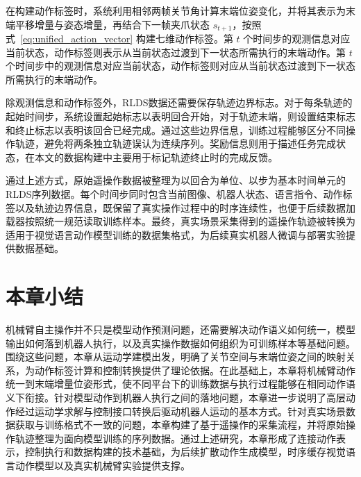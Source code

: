 在构建动作标签时，系统利用相邻两帧关节角计算末端位姿变化，并将其表示为末端平移增量与姿态增量，再结合下一帧夹爪状态 $s_{t+1}$，按照式~\ref{eq:unified_action_vector} 构建七维动作标签。第 $t$ 个时间步的观测信息对应当前状态，动作标签则表示从当前状态过渡到下一状态所需执行的末端动作。第 $t$ 个时间步中的观测信息对应当前状态，动作标签则对应从当前状态过渡到下一状态所需执行的末端动作。

除观测信息和动作标签外，RLDS数据还需要保存轨迹边界标志。对于每条轨迹的起始时间步，系统设置起始标志以表明回合开始，对于轨迹末端，则设置结束标志和终止标志以表明该回合已经完成。通过这些边界信息，训练过程能够区分不同操作轨迹，避免将两条独立轨迹误认为连续序列。奖励信息则用于描述任务完成状态，在本文的数据构建中主要用于标记轨迹终止时的完成反馈。

通过上述方式，原始遥操作数据被整理为以回合为单位、以步为基本时间单元的RLDS序列数据。每个时间步同时包含当前图像、机器人状态、语言指令、动作标签以及轨迹边界信息，既保留了真实操作过程中的时序连续性，也便于后续数据加载器按照统一规范读取训练样本。最终，真实场景采集得到的遥操作轨迹被转换为适用于视觉语言动作模型训练的数据集格式，为后续真实机器人微调与部署实验提供数据基础。

\section{本章小结}

机械臂自主操作并不只是模型动作预测问题，还需要解决动作语义如何统一，模型输出如何落到机器人执行，以及真实操作数据如何组织为可训练样本等基础问题。围绕这些问题，本章从运动学建模出发，明确了关节空间与末端位姿之间的映射关系，为动作标签计算和控制转换提供了理论依据。在此基础上，本章将机械臂动作统一到末端增量位姿形式，使不同平台下的训练数据与执行过程能够在相同动作语义下衔接。针对模型动作到机器人执行之间的落地问题，本章进一步说明了高层动作经过运动学求解与控制接口转换后驱动机器人运动的基本方式。针对真实场景数据获取与训练格式不一致的问题，本章构建了基于遥操作的采集流程，并将原始操作轨迹整理为面向模型训练的序列数据。通过上述研究，本章形成了连接动作表示，控制执行和数据构建的技术基础，为后续扩散动作生成模型，时序缓存视觉语言动作模型以及真实机械臂实验提供支撑。